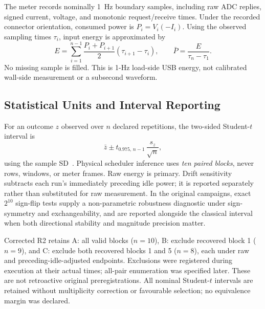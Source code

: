 The meter records nominally 1~Hz boundary samples, including raw ADC replies, signed current, voltage, and monotonic request/receive times. Under the recorded connector orientation, consumed power is $P_i=V_i(-I_i)$. Using the observed sampling times $\tau_i$, input energy is approximated by
\begin{equation}\label{eq:trap}
    E=\sum_{i=1}^{n-1}\frac{P_i+P_{i+1}}{2}(\tau_{i+1}-\tau_i),\qquad
    \bar P = \frac{E}{\tau_n-\tau_1}.
\end{equation}
No missing sample is filled. This is 1-Hz load-side USB energy, not calibrated wall-side measurement or a subsecond waveform.

\subsection{Statistical Units and Interval Reporting}
For an outcome $z$ observed over $n$ declared repetitions, the two-sided Student-$t$ interval is
\begin{equation}\label{eq:tci}
    \bar z\pm t_{0.975,\,n-1}\,\frac{s_z}{\sqrt n},
\end{equation}
using the sample SD~\cite{NISTMean}. Physical scheduler inference uses \emph{ten paired blocks}, never rows, windows, or meter frames. Raw energy is primary. Drift sensitivity subtracts each run's immediately preceding idle power; it is reported separately rather than substituted for raw measurement. In the original campaigns, exact $2^{10}$ sign-flip tests supply a non-parametric robustness diagnostic under sign-symmetry and exchangeability, and are reported alongside the classical interval when both directional stability and magnitude precision matter.

Corrected R2 retains A: all valid blocks ($n=10$), B: exclude recovered block 1 ($n=9$), and C: exclude both recovered blocks 1 and 5 ($n=8$), each under raw and preceding-idle-adjusted endpoints. Exclusions were registered during execution at their actual times; all-pair enumeration was specified later. These are not retroactive original preregistrations. All nominal Student-$t$ intervals are retained without multiplicity correction or favourable selection; no equivalence margin was declared.

